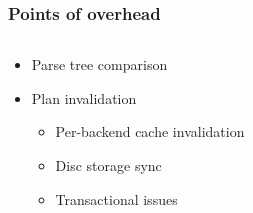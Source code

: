 \documentclass{beamer}
\begin{document}
\begin{frame}[fragile]\frametitle{Points of overhead}
\begin{columns}\begin{column}{0.5\textwidth}
\begin{itemize}
  \item Parse tree comparison
  \item Plan invalidation
  \begin{itemize}
    \item Per-backend cache invalidation
    \item Disc storage sync
    \item Transactional issues
  \end{itemize}
\end{itemize}
\end{column}\begin{column}{0.5\textwidth}
  \begin{center}

\end{center}
\end{column}
\end{columns}
\end{frame}
\end{document}
